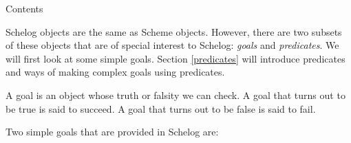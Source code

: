 \beginsection Contents

\tableofcontents

\label{simple}

Schelog objects are the same as Scheme objects.  However, there
are two subsets of these objects that are of special
interest to Schelog: {\em goals} and {\em predicates}.  We
will first look at some simple goals.
Section \ref{predicates} will introduce predicates and ways
of making  complex goals using predicates.

A goal is an object whose truth or falsity we can check.  A
goal that turns out to be true is said to succeed.
A goal that turns out to be false is said to
fail.

Two simple goals that are provided in Schelog are:

\sverbatim{
}

